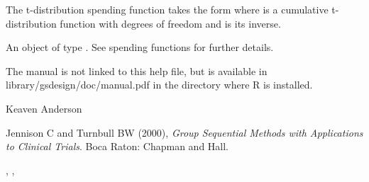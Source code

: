 \begin{Details}\relax
The t-distribution spending function takes the form
where  is a cumulative t-distribution function with  degrees of freedom
and  is its inverse.
\end{Details}
\begin{Value}
An object of type . See spending functions for further details.
\end{Value}
\begin{Note}\relax
The manual is not linked to this help file, but is available in library/gsdesign/doc/manual.pdf
in the directory where R is installed.
\end{Note}
\begin{Author}\relax
Keaven Anderson 
\end{Author}
\begin{References}\relax
Jennison C and Turnbull BW (2000), \emph{Group Sequential Methods with Applications to Clinical Trials}.
Boca Raton: Chapman and Hall.
\end{References}
\begin{SeeAlso}\relax
{}, , 
\end{SeeAlso}
